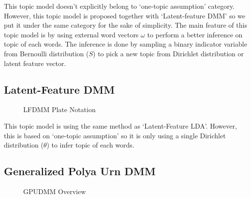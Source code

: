 \documentclass[senior]{IPSstyle}
\begin{document}
This topic model doesn’t explicitly belong to ‘one-topic assumption’ category. However, this topic model is proposed together with ‘Latent-feature DMM’ so we put it under the same category for the sake of simplicity. The main feature of this topic model is by using external word vectors $\omega$ to perform a better inference on topic of each words. The inference is done by sampling a binary indicator variable from Bernoulli distribution ($S$) to pick a new topic from Dirichlet distribution or latent feature vector.

\subsection{Latent-Feature DMM~\cite{nguyen}}

\begin{figure}[h]
	\centering
	\caption{LFDMM Plate Notation}
\label{fig_lfdmm}
\end{figure}

This topic model is using the same method as ‘Latent-Feature LDA’. However, this is based on ‘one-topic assumption’ so it is only using a single Dirichlet distribution ($\theta$) to
infer topic of each words.

\subsection{Generalized Polya Urn DMM~\cite{li}}

\begin{figure}[h]
	\centering
	\caption{GPUDMM Overview}
\label{fig_gpudmm}
\end{figure}
\end{document}
